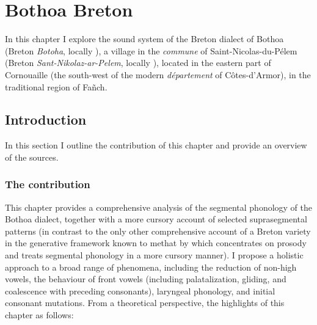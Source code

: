 \chapter{Bothoa Breton}
\label{cha:bothoa-breton}

In this chapter I explore the sound system of the Breton dialect of Bothoa (Breton \emph{Botoha}, locally \ipa{[bɒtəˈhaː]}), a village in the \emph{commune} of Saint-Nicolas-du-Pélem (Breton \emph{Sant-Nikolaz-ar-Pelem}, locally ), located in the eastern part of Cornouaille (the south-west of the modern \emph{département} of Côtes-d'Armor), in the traditional region of Fañch.

\section{Introduction}
\label{sec:introduction-1}

In this section I outline the contribution of this chapter and provide an overview of the sources.

\subsection{The contribution}
\label{sec:contribution-1}

This chapter provides a comprehensive analysis of the segmental phonology of the Bothoa dialect, together with a more cursory account of selected suprasegmental patterns (in contrast to the only other comprehensive account of a Breton variety in the generative framework known to me\dash that by \citealp{carlyle88:_breton}\dash which concentrates on prosody and treats segmental phonology in a more cursory manner). I propose a holistic approach to a broad range of phenomena, including the reduction of non\hyp high vowels, the behaviour of front vowels (including palatalization, gliding, and coalescence with preceding consonants), laryngeal phonology, and initial consonant mutations. From a theoretical perspective, the highlights of this chapter as follows:

